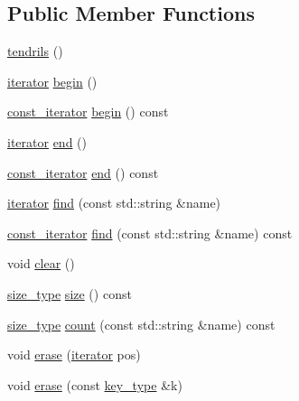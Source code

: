 \subsection*{Public Member Functions}
\begin{DoxyCompactItemize}
\item 
\hyperlink{classecto_1_1tendrils_a4e76bfe7ed91c88fa8bd3249c275c0ef}{tendrils} ()
\item 
\hyperlink{classecto_1_1tendrils_a6f0b7bd6e3a03f047351303630b889e0}{iterator} \hyperlink{classecto_1_1tendrils_a1191620f21a9dc618eb4380e2cf48b63}{begin} ()
\item 
\hyperlink{classecto_1_1tendrils_a86df9983555ca4ebdae8b1d36aa4bbd8}{const\-\_\-iterator} \hyperlink{classecto_1_1tendrils_a10d0c932826165f25406b849b958ad27}{begin} () const 
\item 
\hyperlink{classecto_1_1tendrils_a6f0b7bd6e3a03f047351303630b889e0}{iterator} \hyperlink{classecto_1_1tendrils_ae77c08ecbfff9aa13b442e4e9eb11441}{end} ()
\item 
\hyperlink{classecto_1_1tendrils_a86df9983555ca4ebdae8b1d36aa4bbd8}{const\-\_\-iterator} \hyperlink{classecto_1_1tendrils_aec3278598a3d3bc3c3810ec3cecf72cb}{end} () const 
\item 
\hyperlink{classecto_1_1tendrils_a6f0b7bd6e3a03f047351303630b889e0}{iterator} \hyperlink{classecto_1_1tendrils_a4af12838006b6cfda8157dc3957c166e}{find} (const std\-::string \&name)
\item 
\hyperlink{classecto_1_1tendrils_a86df9983555ca4ebdae8b1d36aa4bbd8}{const\-\_\-iterator} \hyperlink{classecto_1_1tendrils_af0ef7fa5535b477b83620a66331a475b}{find} (const std\-::string \&name) const 
\item 
void \hyperlink{classecto_1_1tendrils_ac7bfc201ab8170684307cb7095323c2d}{clear} ()
\item 
\hyperlink{classecto_1_1tendrils_af3726f822a4fd60a1095bba31f1926ef}{size\-\_\-type} \hyperlink{classecto_1_1tendrils_a3f86ef76f17dbde432321239fcbfd639}{size} () const 
\item 
\hyperlink{classecto_1_1tendrils_af3726f822a4fd60a1095bba31f1926ef}{size\-\_\-type} \hyperlink{classecto_1_1tendrils_aa6bc2c6a64d087c1b516119d0550f83c}{count} (const std\-::string \&name) const 
\item 
void \hyperlink{classecto_1_1tendrils_a700cd209735e5b6254669a6f9c16b74f}{erase} (\hyperlink{classecto_1_1tendrils_a6f0b7bd6e3a03f047351303630b889e0}{iterator} pos)
\item 
void \hyperlink{classecto_1_1tendrils_a58aa945fa23bdeef212ea4a69d077e52}{erase} (const \hyperlink{classecto_1_1tendrils_aa6165c6ab72d93cd56796ea81e450245}{key\-\_\-type} \&k)

\end{DoxyCompactItemize}
